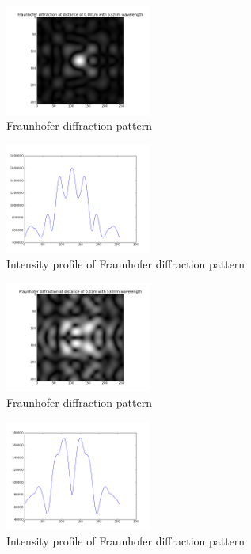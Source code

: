 \documentclass[journal,9pt]{IEEEtran}
\begin{document}
\begin{figure}[H]
\centering
\includegraphics[width=1.9in]{q1d1mm}
\caption{Fraunhofer diffraction pattern}
\label{fig:q1d1mm}
\end{figure}

\begin{figure}[H]
\centering
\includegraphics[width=1.9in]{q1i1mm}
\caption{Intensity profile of Fraunhofer diffraction pattern}
\label{fig:q1i1mm}
\end{figure}

\begin{figure}[H]
\centering
\includegraphics[width=1.9in]{q1d10mm}
\caption{Fraunhofer diffraction pattern}
\label{fig:q1d10mm}
\end{figure}

\begin{figure}[H]
\centering
\includegraphics[width=1.9in]{q1i10mm}
\caption{Intensity profile of Fraunhofer diffraction pattern}
\label{fig:q1i10mm}
\end{figure}
\end{document}
